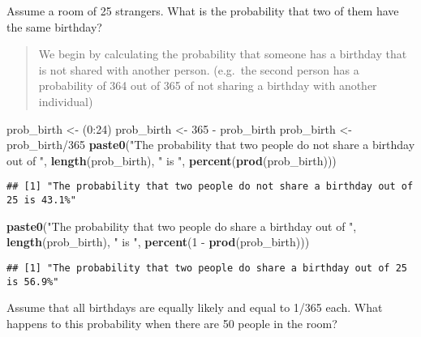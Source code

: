 \documentclass[]{article}
\newenvironment{Shaded}{\begin{snugshade}}{\end{snugshade}}
\newcommand{\KeywordTok}[1]{\textcolor[rgb]{0.13,0.29,0.53}{\textbf{{#1}}}}
\newcommand{\DecValTok}[1]{\textcolor[rgb]{0.00,0.00,0.81}{{#1}}}
\newcommand{\StringTok}[1]{\textcolor[rgb]{0.31,0.60,0.02}{{#1}}}
\newcommand{\NormalTok}[1]{{#1}}
\begin{document}
Assume a room of 25 strangers. What is the probability that two of them
have the same birthday?

\begin{quote}
We begin by calculating the probability that someone has a birthday that
is not shared with another person. (e.g.~the second person has a
probability of 364 out of 365 of not sharing a birthday with another
individual)
\end{quote}

\begin{Shaded}
\begin{Highlighting}[]
\NormalTok{prob_birth <-}\StringTok{ }\NormalTok{(}\DecValTok{0}\NormalTok{:}\DecValTok{24}\NormalTok{)}
\NormalTok{prob_birth <-}\StringTok{ }\DecValTok{365} \NormalTok{-}\StringTok{ }\NormalTok{prob_birth}
\NormalTok{prob_birth <-}\StringTok{ }\NormalTok{prob_birth/}\DecValTok{365}
\KeywordTok{paste0}\NormalTok{(}\StringTok{"The probability that two people do not share a birthday out of "}\NormalTok{, }
       \KeywordTok{length}\NormalTok{(prob_birth), }\StringTok{" is "}\NormalTok{, }\KeywordTok{percent}\NormalTok{(}\KeywordTok{prod}\NormalTok{(prob_birth)))}
\end{Highlighting}
\end{Shaded}

\begin{verbatim}
## [1] "The probability that two people do not share a birthday out of 25 is 43.1%"
\end{verbatim}

\begin{Shaded}
\begin{Highlighting}[]
\KeywordTok{paste0}\NormalTok{(}\StringTok{"The probability that two people do share a birthday out of "}\NormalTok{, }
       \KeywordTok{length}\NormalTok{(prob_birth), }\StringTok{" is "}\NormalTok{, }\KeywordTok{percent}\NormalTok{(}\DecValTok{1} \NormalTok{-}\StringTok{ }\KeywordTok{prod}\NormalTok{(prob_birth)))}
\end{Highlighting}
\end{Shaded}

\begin{verbatim}
## [1] "The probability that two people do share a birthday out of 25 is 56.9%"
\end{verbatim}

Assume that all birthdays are equally likely and equal to 1/365 each.
What happens to this probability when there are 50 people in the room?
\end{document}
